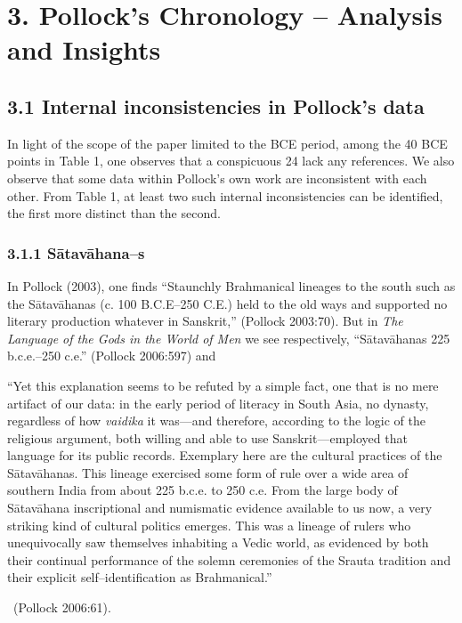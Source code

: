\section*{3. Pollock’s Chronology – Analysis and Insights}

\subsection*{3.1 Internal inconsistencies in Pollock’s data}

In light of the scope of the paper limited to the BCE period, among the 40 BCE points in Table 1, one observes that a conspicuous 24 lack any references. We also observe that some data within Pollock’s own work are inconsistent with each other. From Table 1, at least two such internal inconsistencies can be identified, the first more distinct than the second.

\subsubsection*{3.1.1 Sātavāhana–s}

In Pollock (2003), one finds “Staunchly Brahmanical lineages to the south such as the Sātavāhanas (c. 100 B.C.E–250 C.E.) held to the old ways and supported no literary production whatever in Sanskrit,” (Pollock 2003:70). But in \textit{The Language of the Gods in the World of Men} we see respectively, “Sātavāhanas 225 b.c.e.–250 c.e.” (Pollock 2006:597) and

\begin{myquote}
“Yet this explanation seems to be refuted by a simple fact, one that is no mere artifact of our data: in the early period of literacy in South Asia, no dynasty, regardless of how \textit{vaidika} it was—and therefore, according to the logic of the religious argument, both willing and able to use Sanskrit—employed that language for its public records. Exemplary here are the cultural practices of the Sātavāhanas. This lineage exercised some form of rule over a wide area of southern India from about 225 b.c.e. to 250 c.e. From the large body of Sātavāhana inscriptional and numismatic evidence available to us now, a very striking kind of cultural politics emerges. This was a lineage of rulers who unequivocally saw themselves inhabiting a Vedic world, as evidenced by both their continual performance of the solemn ceremonies of the Srauta tradition and their explicit self–identification as Brahmanical.” 

~\hfill (Pollock 2006:61).
\end{myquote}

